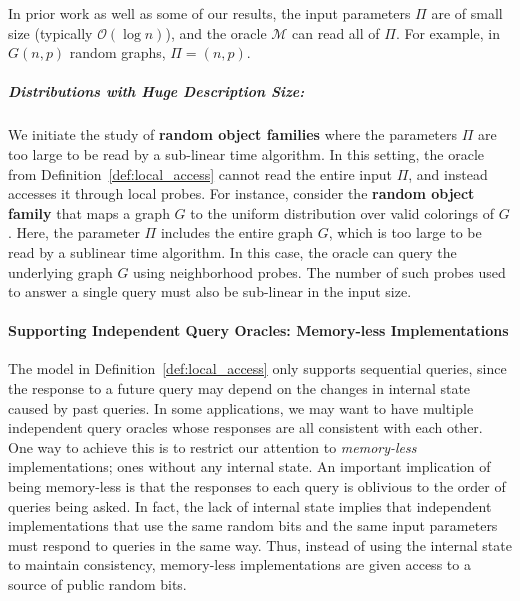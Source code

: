 In prior work \cite{reut, huge, sparse} as well as some of our results, the input parameters $\Pi$ are of small size (typically $\mathcal O(\log n)$),
and the oracle $\mathcal M$ can read all of $\Pi$.
For example, in $G(n,p)$ random graphs, $\Pi = (n, p)$.


\subparagraph*{Distributions with Huge Description Size:}
\label{par:distributions_with_huge_description_size}
We initiate the study of \textbf{random object families} where the parameters $\Pi$ are too large to be read by a sub-linear time algorithm.
In this setting, the oracle from Definition~\ref{def:local_access} cannot read the entire input $\Pi$, and instead accesses it through local probes.
For instance, consider the \textbf{random object family} that maps a graph $G$ to the uniform distribution over valid colorings of $G$.
Here, the parameter $\Pi$ includes the entire graph $G$, which is too large to be read by a sublinear time algorithm.
In this case, the oracle can query the underlying graph $G$ using neighborhood probes.
The number of such probes used to answer a single query must also be sub-linear in the input size.


\paragraph*{Supporting Independent Query Oracles: Memory-less Implementations}
\label{par:supporting_independent_query_oracles_memory_less_implementations}
The model in Definition~\ref{def:local_access} only supports sequential queries,
since the response to a future query may depend on the changes in internal state caused by past queries.
In some applications, we may want to have multiple independent query oracles whose responses are all consistent with each other.
One way to achieve this is to restrict our attention to \emph{memory-less} implementations; ones without any internal state.
An important implication of being memory-less is that the responses to each query is oblivious to the order of queries being asked.
In fact, the lack of internal state implies that independent implementations that use the same random bits and the same input parameters
must respond to queries in the same way.
Thus, instead of using the internal state to maintain consistency, memory-less implementations are given access to a source of public random bits.

